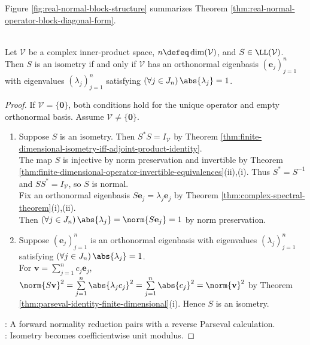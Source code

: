 Figure \ref{fig:real-normal-block-structure} summarizes Theorem \ref{thm:real-normal-operator-block-diagonal-form}.

\begin{illustrationfigure}[H]
  \centering
  
  \caption{Orthogonal line/plane split into scalar and rotation blocks.}
  \label{fig:real-normal-block-structure}
\end{illustrationfigure}

\begin{theorem} \label{thm:complex-isometry-description} \\
Let $\mathcal{V}$ be a complex inner-product space, $n\defeq\dim(\mathcal{V})$, and $S\in\LL(\mathcal{V})$.\\
Then $S$ is an isometry if and only if $\mathcal{V}$ has an orthonormal eigenbasis $(\mathbf{e}_j)_{j=1}^{n}$ with eigenvalues $(\lambda_j)_{j=1}^{n}$ satisfying $(\forall j\in J_n)\,\abs{\lambda_j}=1$.
\begin{proof}
If $\mathcal{V}=\{\mathbf{0}\}$, both conditions hold for the unique operator and empty orthonormal basis. Assume $\mathcal{V}\neq\{\mathbf{0}\}$.
\begin{enumerate}[label=\roman*.]
\setlength{\itemsep}{0pt}
\item[$(\Rightarrow)$] Suppose $S$ is an isometry. Then $S^*S=I_{\mathcal{V}}$ by Theorem \ref{thm:finite-dimensional-isometry-iff-adjoint-product-identity}.\\
The map $S$ is injective by norm preservation and invertible by Theorem \ref{thm:finite-dimensional-operator-invertible-equivalences}(ii),(i). Thus $S^*=S^{-1}$ and $SS^*=I_{\mathcal{V}}$, so $S$ is normal.\\
Fix an orthonormal eigenbasis $S\mathbf{e}_j=\lambda_j\mathbf{e}_j$ by Theorem \ref{thm:complex-spectral-theorem}(i),(ii).\\
Then $(\forall j\in J_n)\,\abs{\lambda_j}=\norm{S\mathbf{e}_j}=1$ by norm preservation.
\item[$(\Leftarrow)$] Suppose $(\mathbf{e}_j)_{j=1}^{n}$ is an orthonormal eigenbasis with eigenvalues $(\lambda_j)_{j=1}^{n}$ satisfying $(\forall j\in J_n)\,\abs{\lambda_j}=1$.\\
For $\mathbf{v}=\sum\limits_{j=1}^{n}c_j\mathbf{e}_j$, $\norm{S\mathbf{v}}^2=\sum\limits_{j=1}^{n}\abs{\lambda_jc_j}^2=\sum\limits_{j=1}^{n}\abs{c_j}^2=\norm{\mathbf{v}}^2$ by Theorem \ref{thm:parseval-identity-finite-dimensional}(i). Hence $S$ is an isometry.
\end{enumerate}
: A forward normality reduction pairs with a reverse Parseval calculation.\\
: Isometry becomes coefficientwise unit modulus.
\end{proof}
\end{theorem}

